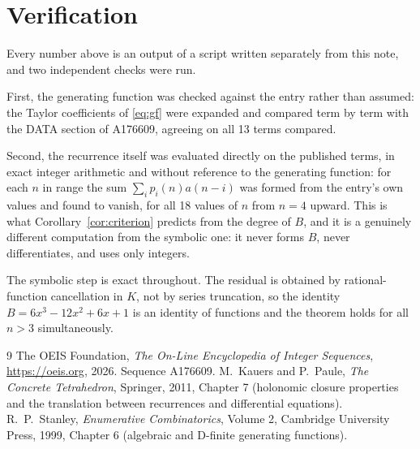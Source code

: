 \documentclass[11pt,a4paper]{article}
\theoremstyle{plain}
\theoremstyle{definition}
\begin{document}
\section{Verification}

Every number above is an output of a script written separately from this note, and two
independent checks were run.

First, the generating function was checked against the entry rather than assumed: the
Taylor coefficients of \eqref{eq:gf} were expanded and compared term by term with the DATA
section of A176609, agreeing on all 13 terms compared.

Second, the recurrence itself was evaluated directly on the published terms, in exact
integer arithmetic and without reference to the generating function: for each $n$ in range
the sum $\sum_{i}p_{i}(n)a(n-i)$ was formed from the entry's own values and found to
vanish, for all 18 values of $n$ from $n=4$ upward. This is what
Corollary~\ref{cor:criterion} predicts from the degree of $B$, and it is a genuinely
different computation from the symbolic one: it never forms $B$, never differentiates, and
uses only integers.

The symbolic step is exact throughout. The residual is obtained by rational-function
cancellation in $K$, not by series truncation, so the identity $B=6 x^{3} - 12 x^{2} + 6 x + 1$ is an
identity of functions and the theorem holds for all $n>3$ simultaneously.

\begin{thebibliography}{9}
 The OEIS Foundation, \emph{The On-Line Encyclopedia of Integer Sequences},
\url{https://oeis.org}, 2026. Sequence A176609.
 M.~Kauers and P.~Paule, \emph{The Concrete Tetrahedron}, Springer, 2011,
Chapter 7 (holonomic closure properties and the translation between recurrences and
differential equations).
 R.~P.~Stanley, \emph{Enumerative Combinatorics}, Volume 2, Cambridge
University Press, 1999, Chapter 6 (algebraic and D-finite generating functions).
\end{thebibliography}
\end{document}
